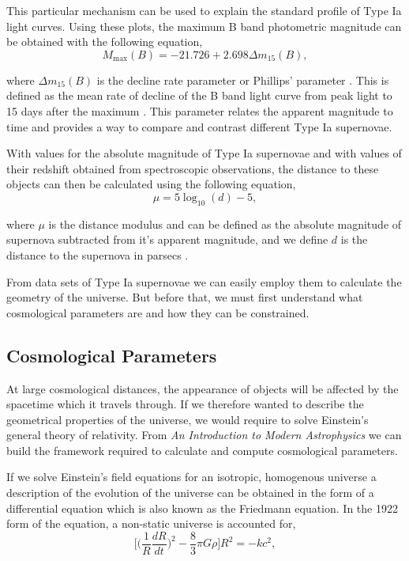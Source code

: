 \documentclass[twocolumn]{revtex4}
\begin{document}
This particular mechanism can be used to explain the standard profile of Type Ia light curves. Using these plots, the maximum B band photometric magnitude can be obtained with the following equation,
\begin{equation}
M_{\max}(B)=-21.726+2.698\Delta m_{15}(B),
\end{equation}

where $\Delta m_{15}(B)$ is the decline rate parameter or Phillips' parameter \cite{high_en_astro}. This is defined as the mean rate of decline of the B band light curve from peak light to 15 days after the maximum \cite{abs_phil}. This parameter relates the apparent magnitude to time and provides a way to compare and contrast different Type Ia supernovae. 

With values for the absolute magnitude of Type Ia supernovae and with values of their redshift obtained from spectroscopic observations, the distance to these objects can then be calculated using the following equation, 
\begin{equation}
\mu = 5 \log_{10}(d) - 5,
\end{equation}

where $\mu$ is the distance modulus and can be defined as the absolute magnitude of supernova subtracted from it's apparent magnitude, and we define $d$ is the distance to the supernova in parsecs \cite{mod_ast}. 

From data sets of Type Ia supernovae we can easily employ them to calculate the geometry of the universe. But before that, we must first understand what cosmological parameters are and how they can be constrained.

\vspace{-3ex}
\subsection{Cosmological Parameters}
\label{sec:cosmo_parameters}
\vspace{-2ex}
At large cosmological distances, the appearance of objects will be affected by the spacetime which it travels through. If we therefore wanted to describe the geometrical properties of the universe, we would require to solve Einstein's general theory of relativity. From \textit{An Introduction to Modern Astrophysics} \cite{mod_ast} we can build the framework required to calculate and compute cosmological parameters. 

If we solve Einstein's field equations for an isotropic, homogenous universe a description of the evolution of the universe can be obtained in the form of a differential equation which is also known as the Friedmann equation. In the 1922 form of the equation, a non-static universe is accounted for,
\begin{equation}
\Big[ \Big( \frac{1}{R} \frac{dR}{dt} \Big)^2 - \frac{8}{3} \pi G \rho \Big] R^2 = -k c^2,
\label{eqn:1922_friedmann}
\end{equation}
\end{document}
